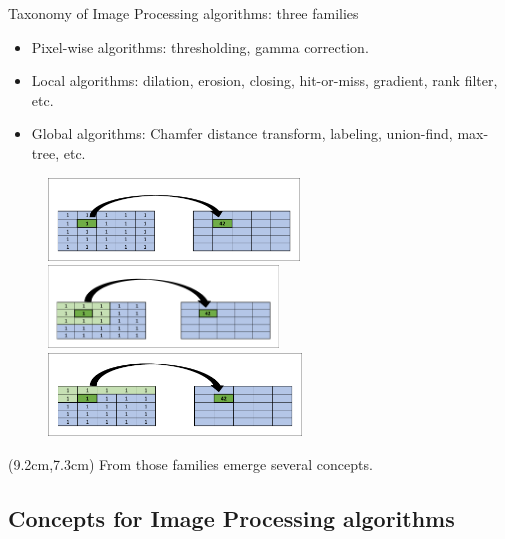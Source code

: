 \documentclass[12pt,aspectratio=169]{beamer}
\begin{document}
\begin{frame}[fragile]{Taxonomy of Image Processing algorithms: three families}
  \small
  \begin{itemize}
    \item Pixel-wise algorithms: thresholding, gamma correction.
    \item Local algorithms: dilation, erosion, closing, hit-or-miss, gradient, rank filter, etc.
    \item Global algorithms: Chamfer distance transform, labeling, union-find, max-tree, etc.
  \end{itemize}
  \begin{figure}[bl]
    \centering
    \hfill
    \includegraphics[height=2.2cm]{../figures/pixel_wise_algorithm}
    \hfill
    \includegraphics[height=2.2cm]{../figures/local_algorithm} \\
    \vspace{-0.05cm}
    \flushleft
    \hspace{0.53cm}\includegraphics[height=2.2cm]{../figures/global_algorithm}
    \hfill
  \end{figure}
  \begin{textblock*}{5.5cm}(9.2cm,7.3cm)
    From those families emerge several concepts.
  \end{textblock*}
\end{frame}

\subsection{Concepts for Image Processing algorithms}
\end{document}
